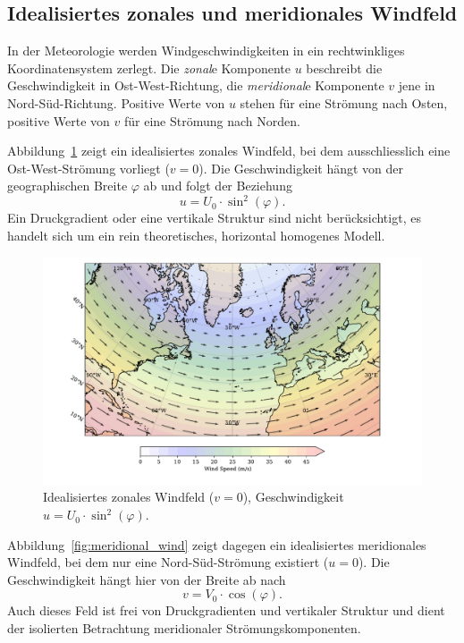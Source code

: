 
\subsection{Idealisiertes zonales und meridionales Windfeld}

In der Meteorologie werden Windgeschwindigkeiten in ein rechtwinkliges
Koordinatensystem zerlegt. Die \emph{zonal}e Komponente \(u\) beschreibt die
%
Geschwindigkeit in Ost-West-Richtung, die \emph{meridional}e Komponente \(v\) jene
%
in Nord-Süd-Richtung. Positive Werte von \(u\) stehen für eine Strömung nach
Osten, positive Werte von \(v\) für eine Strömung nach Norden.

Abbildung~\ref{fig:zonal_wind} zeigt ein idealisiertes zonales Windfeld, bei
dem ausschliesslich eine Ost-West-Strömung vorliegt (\(v = 0\)). Die
Geschwindigkeit hängt von der geographischen Breite \(\varphi\) ab und folgt
der Beziehung
\begin{equation}
	u = U_0 \cdot \sin^2(\varphi).
	\label{rossby:eq:zonal_wind}
\end{equation}
Ein Druckgradient oder eine vertikale Struktur sind nicht berücksichtigt, es handelt sich um ein rein theoretisches, horizontal homogenes Modell.
%

\begin{figure}
	\centering
	\includegraphics[width=\textwidth, trim=1cm 0cm 2cm 0cm, clip]{papers/rossby/images/zonal_wind_plot.pdf}
	\caption{Idealisiertes zonales Windfeld (\(v=0\)), Geschwindigkeit \(u = U_0 \cdot \sin^2(\varphi)\).}
	\label{fig:zonal_wind}
\end{figure}

\noindent
Abbildung~\ref{fig:meridional_wind} zeigt dagegen ein idealisiertes meridionales Windfeld, bei dem nur eine Nord-Süd-Strömung existiert (\(u = 0\)).
Die Geschwindigkeit hängt hier von der Breite ab nach
\begin{equation}
	v = V_0 \cdot \cos(\varphi).
	\label{rossby:eq:meridional_wind}
\end{equation}
Auch dieses Feld ist frei von Druckgradienten und vertikaler Struktur und dient der isolierten Betrachtung meridionaler Strömungskomponenten.

